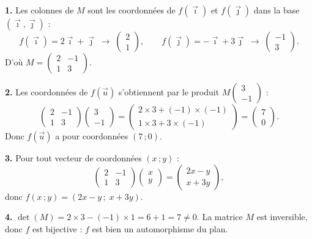 \documentclass[11pt]{article}
\newcommand{\cle}[1]{{\popxbold\color{popdark}#1}}
\begin{document}
\begin{corrige}
\textbf{1.} Les colonnes de $M$ sont les coordonnées de $f(\vec{\imath})$ et $f(\vec{\jmath})$ dans la base $(\vec{\imath}, \vec{\jmath})$ :
\[ f(\vec{\imath}) = 2\vec{\imath} + \vec{\jmath} \;\longrightarrow\; \begin{pmatrix} 2 \\ 1 \end{pmatrix}, \qquad f(\vec{\jmath}) = -\vec{\imath} + 3\vec{\jmath} \;\longrightarrow\; \begin{pmatrix} -1 \\ 3 \end{pmatrix}. \]
D'où $M = \begin{pmatrix} 2 & -1 \\ 1 & 3 \end{pmatrix}$.

\textbf{2.} Les coordonnées de $f(\vec{u})$ s'obtiennent par le produit $M \begin{pmatrix} 3 \\ -1 \end{pmatrix}$ :
\[ \begin{pmatrix} 2 & -1 \\ 1 & 3 \end{pmatrix}\begin{pmatrix} 3 \\ -1 \end{pmatrix} = \begin{pmatrix} 2\times 3 + (-1)\times(-1) \\ 1\times 3 + 3\times(-1) \end{pmatrix} = \begin{pmatrix} 7 \\ 0 \end{pmatrix}. \]
Donc $f(\vec{u})$ a pour coordonnées $(7\,; 0)$.

\textbf{3.} Pour tout vecteur de coordonnées $(x\,; y)$ :
\[ \begin{pmatrix} 2 & -1 \\ 1 & 3 \end{pmatrix}\begin{pmatrix} x \\ y \end{pmatrix} = \begin{pmatrix} 2x - y \\ x + 3y \end{pmatrix}, \]
donc $f(x\,; y) = (2x - y\,; \; x + 3y)$.

\textbf{4.} $\det(M) = 2\times 3 - (-1)\times 1 = 6 + 1 = 7 \neq 0$. La matrice $M$ est inversible, donc $f$ est bijective : $f$ est bien un \cle{automorphisme} du plan.
\end{corrige}
\end{document}
